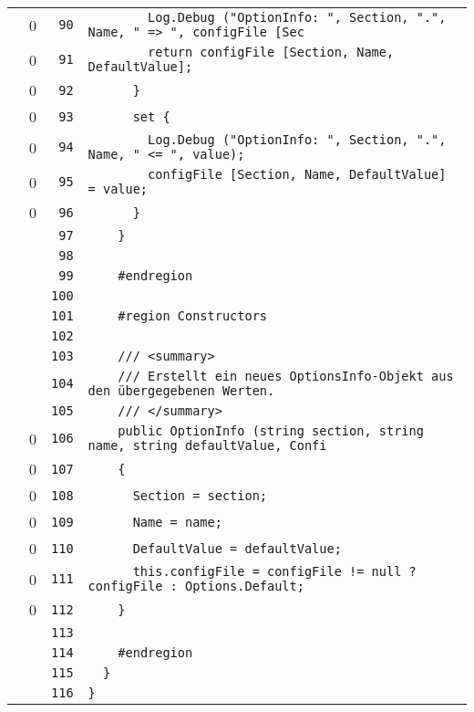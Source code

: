 \documentclass[a4paper,10pt]{article}
\begin{document}
\begin{longtable}[l]{lrrl}
\cellcolor{red} & 0 & \verb~90~ & \verb~        Log.Debug ("OptionInfo: ", Section, ".", Name, " => ", configFile [Sec~\\
\cellcolor{red} & 0 & \verb~91~ & \verb~        return configFile [Section, Name, DefaultValue];~\\
\cellcolor{red} & 0 & \verb~92~ & \verb~      }~\\
\cellcolor{red} & 0 & \verb~93~ & \verb~      set {~\\
\cellcolor{red} & 0 & \verb~94~ & \verb~        Log.Debug ("OptionInfo: ", Section, ".", Name, " <= ", value);~\\
\cellcolor{red} & 0 & \verb~95~ & \verb~        configFile [Section, Name, DefaultValue] = value;~\\
\cellcolor{red} & 0 & \verb~96~ & \verb~      }~\\
\cellcolor{gray} &  & \verb~97~ & \verb~    }~\\
\cellcolor{gray} &  & \verb~98~ & \verb~~\\
\cellcolor{gray} &  & \verb~99~ & \verb~    #endregion~\\
\cellcolor{gray} &  & \verb~100~ & \verb~~\\
\cellcolor{gray} &  & \verb~101~ & \verb~    #region Constructors~\\
\cellcolor{gray} &  & \verb~102~ & \verb~~\\
\cellcolor{gray} &  & \verb~103~ & \verb~    /// <summary>~\\
\cellcolor{gray} &  & \verb~104~ & \verb~    /// Erstellt ein neues OptionsInfo-Objekt aus den übergegebenen Werten.~\\
\cellcolor{gray} &  & \verb~105~ & \verb~    /// </summary>~\\
\cellcolor{red} & 0 & \verb~106~ & \verb~    public OptionInfo (string section, string name, string defaultValue, Confi~\\
\cellcolor{red} & 0 & \verb~107~ & \verb~    {~\\
\cellcolor{red} & 0 & \verb~108~ & \verb~      Section = section;~\\
\cellcolor{red} & 0 & \verb~109~ & \verb~      Name = name;~\\
\cellcolor{red} & 0 & \verb~110~ & \verb~      DefaultValue = defaultValue;~\\
\cellcolor{red} & 0 & \verb~111~ & \verb~      this.configFile = configFile != null ? configFile : Options.Default;~\\
\cellcolor{red} & 0 & \verb~112~ & \verb~    }~\\
\cellcolor{gray} &  & \verb~113~ & \verb~~\\
\cellcolor{gray} &  & \verb~114~ & \verb~    #endregion~\\
\cellcolor{gray} &  & \verb~115~ & \verb~  }~\\
\cellcolor{gray} &  & \verb~116~ & \verb~}~\\
\end{longtable}
\newpage
\end{document}
